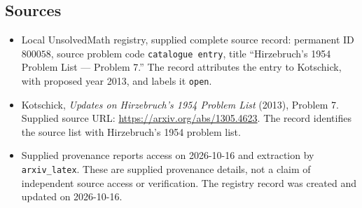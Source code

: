\documentclass[11pt]{article}
\begin{document}
\subsection{Sources}
\begin{itemize}
\item Local UnsolvedMath registry, supplied complete source record: permanent ID \(800058\), source problem code \texttt{catalogue entry}, title ``Hirzebruch's 1954 Problem List --- Problem 7.'' The record attributes the entry to Kotschick, with proposed year 2013, and labels it \texttt{open}.
\item Kotschick, \emph{Updates on Hirzebruch's 1954 Problem List} (2013), Problem 7. Supplied source URL: \url{https://arxiv.org/abs/1305.4623}. The record identifies the source list with Hirzebruch's 1954 problem list.
\item Supplied provenance reports access on 2026-10-16 and extraction by \texttt{arxiv\_latex}. These are supplied provenance details, not a claim of independent source access or verification. The registry record was created and updated on 2026-10-16.
\end{itemize}
\end{document}
